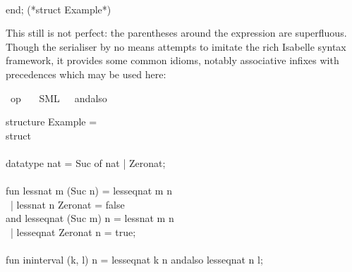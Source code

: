 \begin{isabellebody}
\begin{isamarkuptext}
\hspace*{0pt}\\
\hspace*{0pt}end; (*struct Example*)%
\end{isamarkuptext}%
\isamarkuptrue%
%
\endisatagquote
{\isafoldquote}%
%
\isadelimquote
%
\endisadelimquote
%
\begin{isamarkuptext}%
\noindent This still is not perfect: the parentheses
  around the  expression are superfluous.
  Though the serialiser
  by no means attempts to imitate the rich Isabelle syntax
  framework, it provides some common idioms, notably
  associative infixes with precedences which may be used here:%
\end{isamarkuptext}%
\isamarkuptrue%
%
\isadelimquotett
%
\endisadelimquotett
%
\isatagquotett
{}\isamarkupfalse%
\ {\isachardoublequoteopen}op\ {\isasymand}{\isachardoublequoteclose}\isanewline
\ \ {\isacharparenleft}SML\ \ {}\ {\isachardoublequoteopen}andalso{\isachardoublequoteclose}{\isacharparenright}%
\endisatagquotett
{\isafoldquotett}%
%
\isadelimquotett
%
\endisadelimquotett
%
\isadelimquote
%
\endisadelimquote
%
\isatagquote
%
\begin{isamarkuptext}%
\isaverbatim%
\noindent%
\hspace*{0pt}structure Example = \\
\hspace*{0pt}struct\\
\hspace*{0pt}\\
\hspace*{0pt}datatype nat = Suc of nat | Zero{}nat;\\
\hspace*{0pt}\\
\hspace*{0pt}fun less{}nat m (Suc n) = less{}eq{}nat m n\\
\hspace*{0pt} ~| less{}nat n Zero{}nat = false\\
\hspace*{0pt}and less{}eq{}nat (Suc m) n = less{}nat m n\\
\hspace*{0pt} ~| less{}eq{}nat Zero{}nat n = true;\\
\hspace*{0pt}\\
\hspace*{0pt}fun in{}interval (k, l) n = less{}eq{}nat k n andalso less{}eq{}nat n l;\\

\end{isamarkuptext}
\end{isabellebody}
